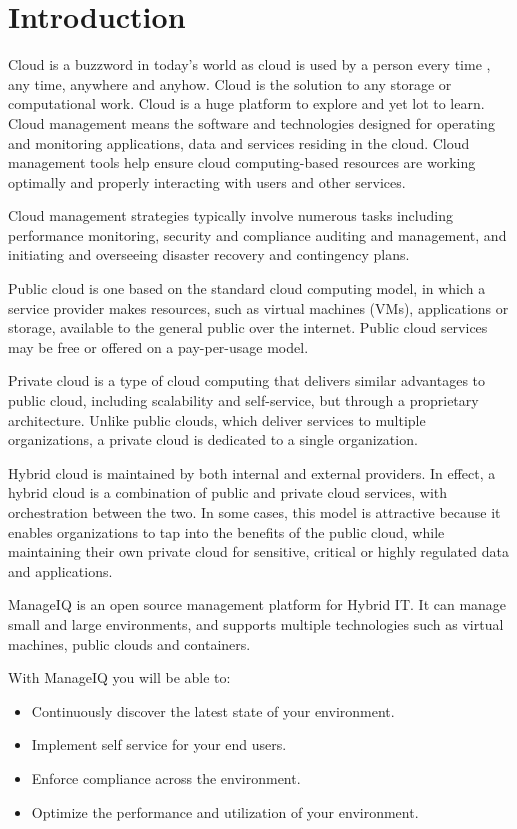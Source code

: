 \documentclass[a4paper,12pt]{report}
\begin{document}
\tableofcontents{}

\chapter{Introduction}
Cloud is a buzzword in today's world as cloud is used by a person every time , any time, anywhere and anyhow. Cloud is the solution to any storage or computational work. Cloud is a huge platform to explore and yet lot to learn. Cloud management means the software and technologies designed for operating and monitoring applications, data and services residing in the cloud. Cloud management tools help ensure cloud computing-based resources are working optimally and properly interacting with users and other services.

Cloud management strategies typically involve numerous tasks including performance monitoring, security and compliance auditing and management, and initiating and overseeing disaster recovery and contingency plans.

Public cloud is one based on the standard cloud computing model, in which a service provider makes resources, such as virtual machines (VMs), applications or storage, available to the general public over the internet. Public cloud services may be free or offered on a pay-per-usage model.

Private cloud is a type of cloud computing that delivers similar advantages to public cloud, including scalability and self-service, but through a proprietary architecture. Unlike public clouds, which deliver services to multiple organizations, a private cloud is dedicated to a single organization.

Hybrid cloud is maintained by both internal and external providers. In effect, a hybrid cloud is a combination of public and private cloud services, with orchestration between the two. In some cases, this model is attractive because it enables organizations to tap into the benefits of the public cloud, while maintaining their own private cloud for sensitive, critical or highly regulated data and applications.

ManageIQ is an open source management platform for Hybrid IT. It can manage small and large environments, and supports multiple technologies such as virtual machines, public clouds and containers.

With ManageIQ you will be able to:
\begin{itemize}
	\item Continuously discover the latest state of your environment.
	\item Implement self service for your end users.
	\item Enforce compliance across the environment.
	\item Optimize the performance and utilization of your environment.
\end{itemize}
\end{document}
